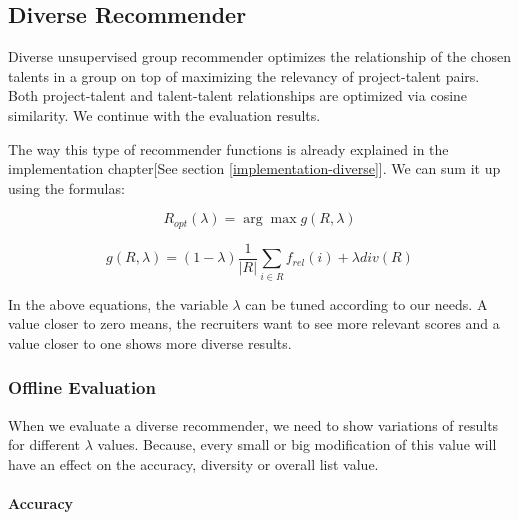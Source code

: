 \subsection{Diverse Recommender}

Diverse unsupervised group recommender optimizes the relationship of the chosen talents in a group on top of maximizing the relevancy of project-talent pairs. Both project-talent and talent-talent relationships are optimized via cosine similarity. We continue with the evaluation results.

The way this type of recommender functions is already explained in the implementation chapter[See section \ref{implementation-diverse}]. We can sum it up using the formulas:

$$
R _ { o p t } ( \lambda ) =  { \arg \max } g ( R , \lambda )
$$

$$
g ( R , \lambda ) = ( 1 - \lambda ) \frac { 1 } { | R | } \sum _ { i \in R } f _ { r e l } ( i ) + \lambda d i v ( R )
$$

In the above equations, the variable $\lambda$ can be tuned according to our needs. A value closer to zero means, the recruiters want to see more relevant scores and a value closer to one shows more diverse results. 

\subsubsection{Offline Evaluation}

When we evaluate a diverse recommender, we need to show variations of results for different $\lambda$ values. Because, every small or big modification of this value will have an effect on the accuracy, diversity or overall list value.

\paragraph{Accuracy}

